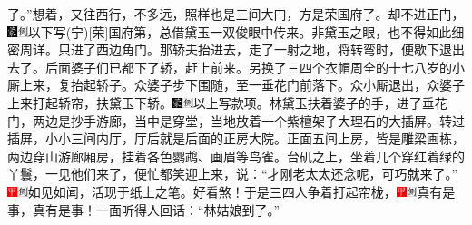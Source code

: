 了。”想着，又往西行，不多远，照样也是三间大门，方是荣国府了。却不进正门，{\includegraphics[width=3mm]{../Images/00006}\includegraphics[width=3mm]{../Images/00011}\footnotesize \kaishu 以下写{(宁)}{[}荣{]}国府第，总借黛玉一双俊眼中传来。非黛玉之眼，也不得如此细密周详。}只进了西边角门。那轿夫抬进去，走了一射之地，将转弯时，便歇下退出去了。后面婆子们已都下了轿，赶上前来。另换了三四个衣帽周全的十七八岁的小厮上来，复抬起轿子。众婆子步下围随，至一垂花门前落下。众小厮退出，众婆子上来打起轿帘，扶黛玉下轿。{\includegraphics[width=3mm]{../Images/00006}\includegraphics[width=3mm]{../Images/00011}\footnotesize \kaishu 以上写款项。}林黛玉扶着婆子的手，进了垂花门，两边是抄手游廊，当中是穿堂，当地放着一个紫檀架子大理石的大插屏。转过插屏，小小三间内厅，厅后就是后面的正房大院。正面五间上房，皆是雕梁画栋，两边穿山游廊厢房，挂着各色鹦鹉、画眉等鸟雀。台矶之上，坐着几个穿红着绿的丫鬟，一见他们来了，便忙都笑迎上来，说：“才刚老太太还念呢，可巧就来了。”{\includegraphics[width=3mm]{../Images/00002}\includegraphics[width=3mm]{../Images/00011}\footnotesize \kaishu 如见如闻，活现于纸上之笔。好看煞！}于是三四人争着打起帘栊，{\includegraphics[width=3mm]{../Images/00002}\includegraphics[width=3mm]{../Images/00011}\footnotesize \kaishu 真有是事，真有是事！}一面听得人回话：“林姑娘到了。”

